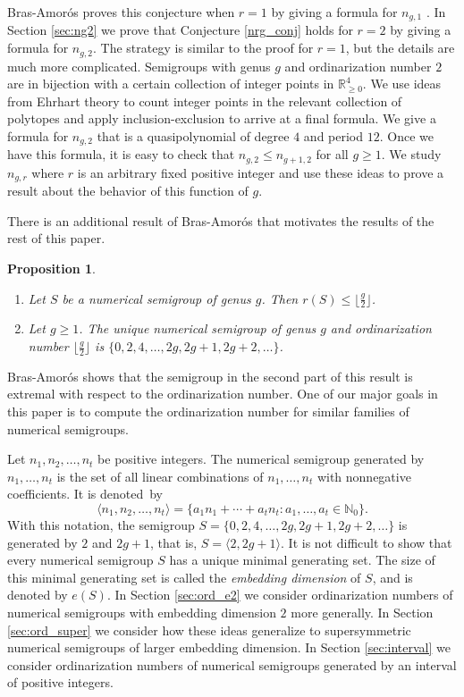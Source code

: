 \documentclass[12pt]{amsart}
\newcommand{\N}{{\mathbb N}}
\newcommand{\R}{{\mathbb R}}
\theoremstyle{plain}\newtheorem{proposition}{Proposition}[section]
\begin{document}
Bras-Amor\'os proves this conjecture when $r = 1$ by giving a formula for $n_{g,1}$ \cite[Corollary 9]{Bras-Amoros_ord}.  In Section \ref{sec:ng2} we prove that Conjecture \ref{nrg_conj} holds for $r=2$ by giving a formula for $n_{g,2}$.  The strategy is similar to the proof for $r=1$, but the details are much more complicated.   Semigroups with genus $g$ and ordinarization number $2$ are in bijection with a certain collection of integer points in $\R_{\ge 0}^4$.  We use ideas from Ehrhart theory to count integer points in the relevant collection of polytopes and apply inclusion-exclusion to arrive at a final formula.  We give a formula for $n_{g,2}$ that is a quasipolynomial of degree $4$ and period $12$.  Once we have this formula, it is easy to check that $n_{g,2} \le n_{g+1,2}$ for all $g\ge 1$.  We study $n_{g,r}$ where $r$ is an arbitrary fixed positive integer and use these ideas to prove a result about the behavior of this function of $g$.

There is an additional result of Bras-Amor\'os that motivates the results of the rest of this paper.  
\begin{proposition} \cite[Lemma 2 and Lemma 4]{Bras-Amoros_ord}\label{Prop_BA_m2}
\begin{enumerate}
\item Let $S$ be a numerical semigroup of genus $g$.  Then $r(S) \le \lfloor\frac{g}{2}\rfloor$.
\item Let $g \ge 1$.  The unique numerical semigroup of genus $g$ and ordinarization number $\lfloor \frac{g}{2} \rfloor$ is $\{0,2,4,\ldots, 2g,2g+1, 2g+2,\ldots\}$.
\end{enumerate}
\end{proposition}
Bras-Amor\'os shows that the semigroup in the second part of this result is extremal with respect to the ordinarization number.  One of our major goals in this paper is to compute the ordinarization number for similar families of numerical semigroups.

Let $n_1, n_2, \ldots, n_t$ be positive integers.  The numerical semigroup generated by $n_1,\ldots, n_t$ is the set of all linear combinations of $n_1,\ldots, n_t$ with nonnegative coefficients.  It is denoted~by
\[
\langle n_1, n_2,\ldots, n_t \rangle = \{a_1 n_1 + \cdots + a_t n_t \colon a_1,\ldots, a_t \in \N_0\}.
\]
With this notation, the semigroup $S = \{0,2,4,\ldots, 2g,2g+1, 2g+2,\ldots\}$ is generated by $2$ and $2g+1$, that is, $S = \langle 2,2g+1\rangle$.  It is not difficult to show that every numerical semigroup $S$ has a unique minimal generating set.  The size of this minimal generating set is called the \emph{embedding dimension} of $S$, and is denoted by $e(S)$.  In Section \ref{sec:ord_e2} we consider ordinarization numbers of numerical semigroups with embedding dimension $2$ more generally.  In Section \ref{sec:ord_super}  we consider how these ideas generalize to supersymmetric numerical semigroups of larger embedding dimension.   In Section \ref{sec:interval} we consider ordinarization numbers of numerical semigroups generated by an interval of positive integers.
\end{document}
